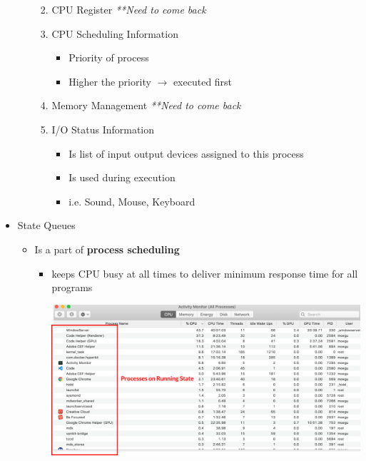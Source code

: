 \documentclass[12pt]{article}
\begin{document}
\begin{itemize}
\begin{itemize}
\begin{enumerate}
\begin{itemize}
            \end{itemize}
            \item CPU Register \textit{**Need to come back}
            \item CPU Scheduling Information
            \begin{itemize}
                \item Priority of process
                \item Higher the priority $\to$ executed first
            \end{itemize}
            \item Memory Management \textit{**Need to come back}
            \item I/O Status Information
            \begin{itemize}
                \item Is list of input output devices assigned to this process
                \item Is used during execution
                \item i.e. Sound, Mouse, Keyboard
            \end{itemize}
        \end{enumerate}
    \end{itemize}

    \item State Queues

    \begin{itemize}
        \item Is a part of \textbf{process scheduling}
        \begin{itemize}
            \item keeps CPU busy at all times to deliver minimum response time
            for all programs

            \begin{center}
            \includegraphics[width=\linewidth]{../images/week_1_notes_1_6.png}
            \end{center}


\end{itemize}
\end{itemize}
\end{itemize}
\end{document}
